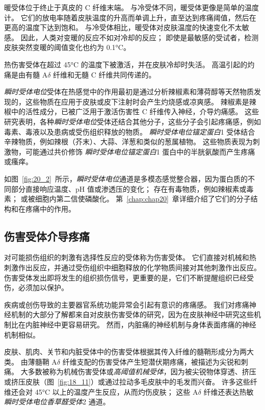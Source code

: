 暖受体位于终止于真皮的 C 纤维末端。
与冷受体不同，暖受体更像是简单的温度计。
它们的放电率随着皮肤温度的升高而单调上升，直至达到疼痛阈值，然后在更高的温度下达到饱和。
与冷受体相比，暖受体对皮肤温度的快速变化不太敏感。
因此，人类对变暖的反应不如对冷却的反应；
即使是最敏感的受试者，检测皮肤突然变暖的阈值变化也约为 0.1°C。


热伤害受体在超过 45°C 的温度下被激活，并在皮肤冷却时失活。
高温引起的灼痛是由有髓 A$\delta$ 纤维和无髓 C 纤维共同传递的。


\textit{瞬时受体电位}受体在热感觉中的作用最初是通过分析辣椒素和薄荷醇等天然物质发现的，这些物质在应用于皮肤或皮下注射时会产生灼烧感或凉爽感。
辣椒素是辣椒中的活性成分，已被广泛用于激活伤害性 C 纤维传入神经，介导灼痛感。
这些研究表明，各种\textit{瞬时受体电位}受体还结合其他分子，这些分子会引起疼痛感，例如毒素、毒液以及患病或受伤组织释放的物质。
\textit{瞬时受体电位锚定蛋白}1 受体结合辛辣物质，例如辣根（芥末）、大蒜、洋葱和类似的葱属植物。
这些物质表现为刺激物，可能通过共价修饰 \textit{瞬时受体电位锚定蛋白}1 蛋白中的半胱氨酸而产生疼痛或瘙痒。


如图~\ref{fig:20_2}~所示，\textit{瞬时受体电位}通道是多模态感觉整合器，因为蛋白质的不同部分直接响应温度、pH 值或渗透压的变化；
存在有毒物质，例如辣椒素或毒素；
或被细胞内第二信使磷酸化。
第~\ref{chap:chap20}~章详细介绍了它们的分子结构和在疼痛中的作用。



\subsection{伤害受体介导疼痛}

对可能损伤组织的刺激有选择性反应的受体称为伤害受体。
它们直接对机械和热刺激作出反应，并通过受伤组织中细胞释放的化学物质间接对其他刺激作出反应。
伤害受体发出即将发生的组织损伤信号，更重要的是，它们不断提醒组织已经受伤，必须加以保护。


疾病或创伤导致的主要器官系统功能异常会引起有意识的疼痛感。
我们对疼痛神经机制的大部分了解都来自对皮肤伤害受体的研究，因为在皮肤神经中研究这些机制比在内脏神经中更容易研究。
然而，内脏痛的神经机制与身体表面疼痛的神经机制相似。


皮肤、肌肉、关节和内脏受体中的伤害受体根据其传入纤维的髓鞘形成分为两大类。
由薄髓鞘 A$\delta$ 纤维支配的伤害受体产生短潜伏期疼痛，被描述为尖锐和刺痛。
大多数被称为机械伤害受体或\textit{高阈值机械受体}，因为被尖锐物体穿透、挤压或挤压皮肤（图~\ref{fig:18_11}）或通过拉动多毛皮肤中的毛发而兴奋。
许多这些纤维还会对 45°C 以上的温度产生反应，从而灼伤皮肤；
这些 A$\delta$ 纤维还表达热敏 \textit{瞬时受体电位香草醛受体}2 通道。


